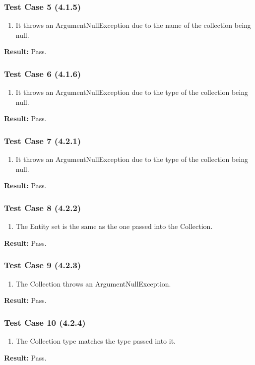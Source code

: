\documentclass[a4paper,12pt]{article}
\begin{document}
		\subsubsection{Test Case 5 (4.1.5)}
				\begin{enumerate}
					\item It throws an ArgumentNullException due to the name of the collection being null.
				\end{enumerate}
			\textbf{Result: }Pass.
		\subsubsection{Test Case 6 (4.1.6)}
				\begin{enumerate}
					\item It throws an ArgumentNullException due to the type of the collection being null.
				\end{enumerate}
			\textbf{Result: }Pass.
		\subsubsection{Test Case 7 (4.2.1)}
				\begin{enumerate}
					\item It throws an ArgumentNullException due to the type of the collection being null.
				\end{enumerate}
			\textbf{Result: }Pass.
		\subsubsection{Test Case 8 (4.2.2)}
				\begin{enumerate}
					\item The Entity set is the same as the one passed into the Collection.
				\end{enumerate}
			\textbf{Result: }Pass.
		\subsubsection{Test Case 9 (4.2.3)}
				\begin{enumerate}
					\item The Collection throws an ArgumentNullException.
				\end{enumerate}
			\textbf{Result: }Pass.
		\subsubsection{Test Case 10 (4.2.4)}
				\begin{enumerate}
					\item The Collection type matches the type passed into it.
				\end{enumerate}
			\textbf{Result: }Pass.
\end{document}
